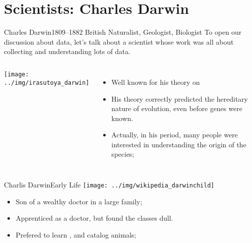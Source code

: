 \section{Scientists: Charles Darwin}

\begin{frame}{Charles Darwin}{1809--1882 British Naturalist, Geologist, Biologist}
  To open our discussion about data, let's talk about a scientist whose work was all about collecting and understanding lots of data.
  \bigskip

  \begin{columns}
    \texttt{[image: ../img/irasutoya\_darwin]}
    \begin{itemize}
      \item Well known for his theory on 
      \item His theory correctly predicted the hereditary nature of evolution, even before genes were known.
      \item Actually, in his period, many people were interested in understanding the origin of the species;
    \end{itemize}
  \end{columns}
\end{frame}

\begin{frame}{Charlis Darwin}{Early Life}
  \hfill\texttt{[image: ../img/wikipedia\_darwinchild]}
  \bigskip

  \begin{itemize}
    \item Son of a wealthy doctor in a large family;
    \item Apprenticed as a doctor, but found the classes dull.
    \item Prefered to learn , and catalog animals;
  \end{itemize}
\end{frame}

